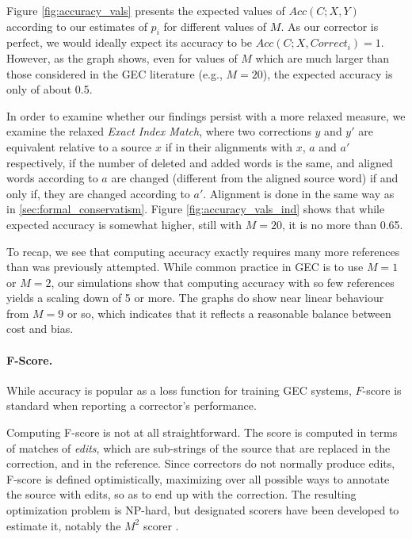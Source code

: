 \documentclass[letter,11pt]{article}
\begin{document}
 Figure \ref{fig:accuracy_vals} presents the expected values of $Acc(C;X,Y)$ according to our estimates of $p_i$ for
 different values of $M$. As our corrector is perfect, we would ideally expect its accuracy to be
 $Acc(C;X,Correct_i) = 1$. However, as the graph shows, even for values of $M$ which are much larger than
 those considered in the GEC literature (e.g., $M=20$), the expected accuracy is only of about 0.5.
 
 In order to examine whether our findings persist with a more relaxed measure, we examine the relaxed
 {\it Exact Index Match}, where two corrections $y$ and $y'$
 are equivalent relative to a source $x$ if in their alignments with $x$, $a$ and $a'$ respectively,
 if the number of deleted and added words is the same, and aligned words according to $a$ are
 changed (different from the aligned source word) if and only if, they are changed according to $a'$. Alignment is done in the same way as in \ref{sec:formal_conservatism}. Figure \ref{fig:accuracy_vals_ind}
 shows that while expected accuracy is somewhat higher, still with $M=20$, it is no more than 0.65.
 
 To recap, we see that computing accuracy exactly requires many more references than was previously attempted.
 While common practice in GEC is to use $M=1$ or $M=2$, our simulations show that computing accuracy with
 so few references yields a scaling down of 5 or more. The graphs do show near linear behaviour from $M=9$ or
 so, which indicates that it reflects a reasonable balance between cost and bias.
 
 \paragraph{F-Score.}
 While accuracy is popular as a loss function for training GEC systems,
 $F$-score is standard when reporting a corrector's performance.

 Computing F-score is not at all straightforward. The score is computed
 in terms of matches of {\it edits}, which are sub-strings of the source
 that are replaced in the correction, and in the reference. Since correctors
 do not normally produce edits, F-score is defined optimistically, maximizing
 over all possible ways to annotate the source with edits, so as to end
 up with the correction. 
 The resulting optimization problem is NP-hard, but designated scorers
 have been developed to estimate it, notably the $M^2$ scorer
 \cite{dahlmeier2012better}.
\end{document}
